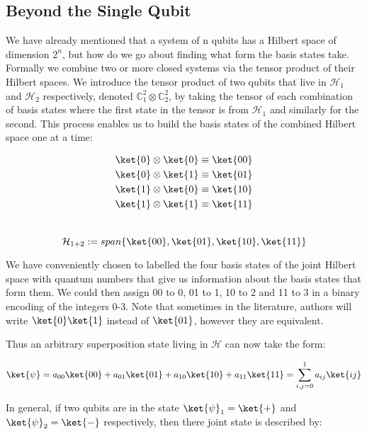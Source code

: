 \subsection{Beyond the Single Qubit}

We have already mentioned that a system of n qubits has a Hilbert space of dimension $2^n$, but how do we go about finding what form the basis states take. Formally we combine two or more closed systems via the tensor product of their Hilbert spaces. We introduce the tensor product of two qubits that live in $\mathcal{H}_1$ and $\mathcal{H}_2$ respectively, denoted $\mathbb{C}_1^2 \otimes \mathbb{C}_2^2$, by taking the tensor of each combination of basis states where the first state in the tensor is from $\mathcal{H}_1$ and similarly for the second. This process enables us to build the basis states of the combined Hilbert space one at a time:

\begin{equation}
\begin{split}
    \ket{0}\otimes\ket{0} \equiv\ket{00}\\
    \ket{0}\otimes\ket{1} \equiv\ket{01}\\
    \ket{1}\otimes\ket{0} \equiv\ket{10}\\
    \ket{1}\otimes\ket{1} \equiv\ket{11}
\end{split}
\end{equation}\\
\begin{equation}
    \mathcal{H}_{1+2}:=span\{\ket{00}, \ket{01}, \ket{10}, \ket{11}\}
\end{equation}

We have conveniently chosen to labelled the four basis states of the joint Hilbert space with quantum numbers that give us information about the basis states that form them. We could then assign 00 to 0, 01 to 1, 10 to 2 and 11 to 3 in a binary encoding of the integers 0-3. Note that sometimes in the literature, authors will write $\ket{0}\ket{1}$ instead of $\ket{01}$, however they are equivalent.

Thus an arbitrary superposition state living in $\mathcal{H}$ can now take the form:

\begin{equation}
    \ket{\psi}=a_{00}\ket{00}+a_{01}\ket{01}+a_{10}\ket{10}+a_{11}\ket{11} = \sum_{i,j=0}^{1}a_{ij}\ket{ij}
\end{equation}

In general, if two qubits are in the state $\ket{\psi}_1 = \ket{+}$ and $\ket{\psi}_2 = \ket{-}$ respectively, then there joint state is described by:

